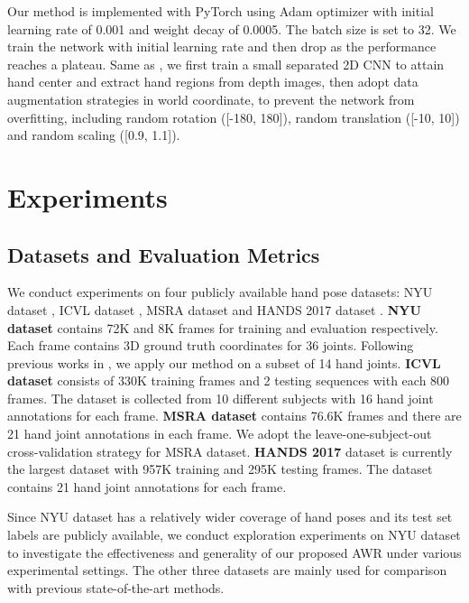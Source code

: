 \documentclass[letterpaper]{article} \usepackage{aaai20}  \usepackage{times}  \usepackage{helvet} \usepackage{courier}  \usepackage[hyphens]{url}  \usepackage{graphicx} \usepackage{amsmath}
\begin{document}
\parskip=0pt

Our method is implemented with PyTorch using Adam \cite{adam} optimizer with initial learning rate of 0.001 and weight decay of 0.0005. The batch size is set to 32. We train the network with initial learning rate and then drop as the performance reaches a plateau. Same as \cite{srn}, we first train a small separated 2D CNN to attain hand center and extract hand regions from depth images, then adopt data augmentation strategies in world coordinate, to prevent the network from overfitting, including random rotation ([-180, 180]), random translation ([-10, 10]) and random scaling ([0.9, 1.1]).

\parskip=0pt

\section{Experiments}

\subsection{Datasets and Evaluation Metrics}

We conduct experiments on four publicly available hand pose datasets: NYU dataset \cite{nyu}, ICVL dataset \cite{icvl}, MSRA dataset \cite{offset2} and HANDS 2017 dataset \cite{hands17}. \textbf{NYU dataset} contains 72K and 8K frames for training and evaluation respectively. Each frame contains 3D ground truth coordinates for 36 joints. Following previous works in \cite{p2p}, we apply our method on a subset of 14 hand joints. \textbf{ICVL dataset} consists of 330K training frames and 2 testing sequences with each 800 frames. The dataset is collected from 10 different subjects with 16 hand joint annotations for each frame. \textbf{MSRA dataset} contains 76.6K frames and there are 21 hand joint annotations in each frame. We adopt the leave-one-subject-out cross-validation strategy for MSRA dataset. \textbf{HANDS 2017} dataset is currently the largest dataset with 957K training and 295K testing frames. The dataset contains 21 hand joint annotations for each frame.

\parskip=0pt

Since NYU dataset has a relatively wider coverage of hand poses and its test set labels are publicly available, we conduct exploration experiments on NYU dataset to investigate the effectiveness and generality of our proposed AWR under various experimental settings. The other three datasets are mainly used for comparison with previous state-of-the-art methods. 
\end{document}
